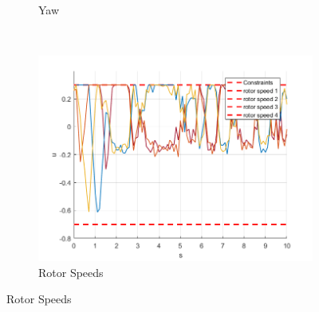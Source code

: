 \documentclass[11pt]{article}
\begin{document}
\begin{enumerate}
\begin{figure}[ht]
\begin{subfigure}[c]{0.3\linewidth}
            \caption{Yaw}
        \end{subfigure}
        ~
        \begin{subfigure}[c]{0.3\linewidth}
            \centering
            \includegraphics[width=\linewidth]{Plots_14_SlewRateConstraints/03}
            \caption{Rotor Speeds}
        \end{subfigure}


\end{figure}
\end{enumerate}
\end{document}
